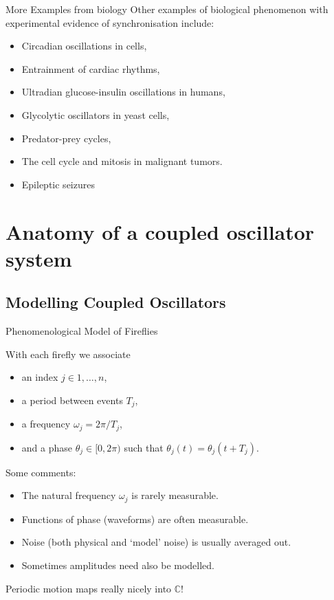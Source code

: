 \documentclass[10pt,reqno]{beamer}
\newcommand{\complex}{\mathbb{C}}
\begin{document}
\begin{frame}{More Examples from biology}
Other examples of biological phenomenon with experimental evidence of synchronisation include\cite{synch}:
\begin{itemize}
	\item Circadian oscillations in cells,
	\item Entrainment of cardiac rhythms,
	\item Ultradian glucose-insulin oscillations in humans,
	\item Glycolytic oscillators in yeast cells,
	\item Predator-prey cycles,
	\item The cell cycle and mitosis in malignant tumors.
	\item Epileptic seizures
\end{itemize}
\end{frame}
\section{Anatomy of a coupled oscillator system}
\subsection{Modelling Coupled Oscillators}
\begin{frame}{Phenomenological Model of Fireflies}
\begin{minipage}{0.46\textwidth}
\begin{figure}
\end{figure}
\end{minipage}\hfill
\begin{minipage}{0.46\textwidth}
With each firefly we associate
\begin{itemize}
	\item an index $j \in 1,\ldots,n$, 
	\item a period between events $T_j$,
	\item a frequency $\omega_j = 2\pi/T_j$,
	\item and a phase $\theta_j \in [0,2\pi)$  such that $\theta_j(t) = \theta_j(t+T_j)$.
\end{itemize}
\end{minipage}

\vspace{15pt}

Some comments:
\begin{itemize}
	\item The natural frequency $\omega_j$ is rarely measurable.
	\item Functions of phase (waveforms) are often measurable.
	\item Noise (both physical and `model' noise) is usually averaged out.
	\item Sometimes amplitudes need also be modelled.
\end{itemize}

\begin{center}
	\vfill
Periodic motion maps really nicely into $\complex$!
\end{center}
\end{frame}
\end{document}
